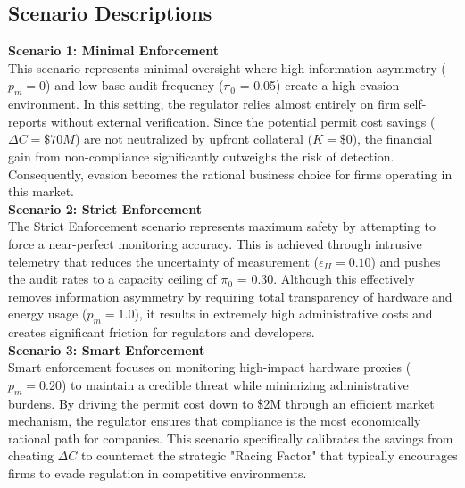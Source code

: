 \subsection*{Scenario Descriptions}

\noindent\textbf{Scenario 1: Minimal Enforcement} \\
This scenario represents minimal oversight where high information asymmetry ($p_m = 0$) and low base audit frequency ($\pi_0$ = 0.05) create a high-evasion environment. In this setting, the regulator relies almost entirely on firm self-reports without external verification. Since the potential permit cost savings ($\Delta C = \$70M$) are not neutralized by upfront collateral ($K = \$0$), the financial gain from non-compliance significantly outweighs the risk of detection. Consequently, evasion becomes the rational business choice for firms operating in this market. \\

\noindent\textbf{Scenario 2: Strict Enforcement} \\
The Strict Enforcement scenario represents maximum safety by attempting to force a near-perfect monitoring accuracy. This is achieved through intrusive telemetry that reduces the uncertainty of measurement ($\epsilon_{II} = 0.10$) and pushes the audit rates to a capacity ceiling of $\pi_0$ = 0.30. Although this effectively removes information asymmetry by requiring total transparency of hardware and energy usage ($p_m = 1.0$), it results in extremely high administrative costs and creates significant friction for regulators and developers. \\

\noindent\textbf{Scenario 3: Smart Enforcement} \\
Smart enforcement focuses on monitoring high-impact hardware proxies ($p_m = 0.20$) to maintain a credible threat while minimizing administrative burdens. By driving the permit cost down to \$2M through an efficient market mechanism, the regulator ensures that compliance is the most economically rational path for companies. This scenario specifically calibrates the savings from cheating $\Delta C$ to counteract the strategic "Racing Factor" that typically encourages firms to evade regulation in competitive environments. \\


